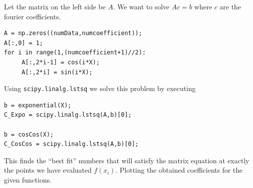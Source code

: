 \documentclass[12pt, a4paper]{report}
\begin{document}
Let the matrix on the left side be $A$. We want to solve $Ac = b$ where $c$ are the fourier coefficients.
\begin{verbatim}
A = np.zeros((numData,numcoefficient));
A[:,0] = 1;
for i in range(1,(numcoefficient+1)//2):
     A[:,2*i-1] = cos(i*X);
     A[:,2*i] = sin(i*X);
\end{verbatim}

Using \texttt{scipy.linalg.lstsq} we solve this problem by executing
\begin{verbatim}
b = exponential(X);
C_Expo = scipy.linalg.lstsq(A,b)[0];

b = cosCos(X);
C_CosCos = scipy.linalg.lstsq(A,b)[0];
\end{verbatim}

This finds the “best fit” numbers that will satisfy the matrix equation at exactly the points we have evaluated $f(x_i)$. Plotting the obtained coefficients for the given functions. 
\end{document}
